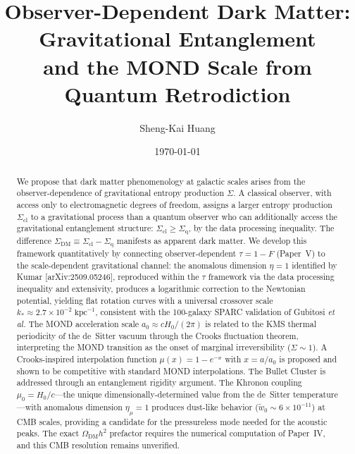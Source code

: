 \documentclass[prd,twocolumn,superscriptaddress,longbibliography,floatfix]{revtex4-2}
\newcommand{\tauasym}{\tau}
\begin{document}
\title{Observer-Dependent Dark Matter: Gravitational Entanglement\\
and the MOND Scale from Quantum Retrodiction}

\author{Sheng-Kai Huang}

\date{\today}

\begin{abstract}
We propose that dark matter phenomenology at galactic scales
arises from the observer-dependence of gravitational entropy
production $\Sigma$.
A classical observer, with access only to electromagnetic
degrees of freedom, assigns a larger entropy production
$\Sigma_{\mathrm{cl}}$ to a gravitational process than a
quantum observer who can additionally access the gravitational
entanglement structure: $\Sigma_{\mathrm{cl}} \geq
\Sigma_{\mathrm{q}}$, by the data processing inequality.
The difference $\Sigma_{\mathrm{DM}} \equiv
\Sigma_{\mathrm{cl}} - \Sigma_{\mathrm{q}}$ manifests as
apparent dark matter.
We develop this framework quantitatively by connecting
observer-dependent $\tauasym = 1 - F$ (Paper~V) to the
scale-dependent gravitational channel: the anomalous dimension
$\eta = 1$ identified by Kumar [arXiv:2509.05246], reproduced
within the $\tauasym$ framework via the data processing
inequality and extensivity, produces a logarithmic correction
to the Newtonian potential, yielding flat rotation curves with
a universal crossover scale $k_* \approx 2.7 \times 10^{-2}
\;\mathrm{kpc}^{-1}$, consistent with the 100-galaxy SPARC
validation of Gubitosi \emph{et al.}
The MOND acceleration scale $a_0 \approx
cH_0/(2\pi)$ is related to the KMS thermal periodicity of the
de~Sitter vacuum through the Crooks fluctuation theorem,
interpreting the MOND transition as the onset of marginal
irreversibility ($\Sigma \sim 1$).
A Crooks-inspired interpolation function
$\mu(x) = 1 - e^{-x}$ with $x = a/a_0$ is proposed and
shown to be competitive with standard MOND interpolations.
The Bullet Cluster is addressed through an entanglement
rigidity argument.
The Khronon coupling
$\mu_0 = H_0/c$---the unique dimensionally-determined value
from the de~Sitter temperature---with anomalous dimension
$\eta_\mu = 1$ produces dust-like behavior
($\tilde{w}_0 \sim 6 \times 10^{-11}$) at CMB scales,
providing a candidate for the pressureless mode needed for
the acoustic peaks.
The exact $\Omega_{\mathrm{DM}} h^2$ prefactor requires
the numerical computation of Paper~IV, and this CMB
resolution remains unverified.
\end{abstract}
\end{document}
